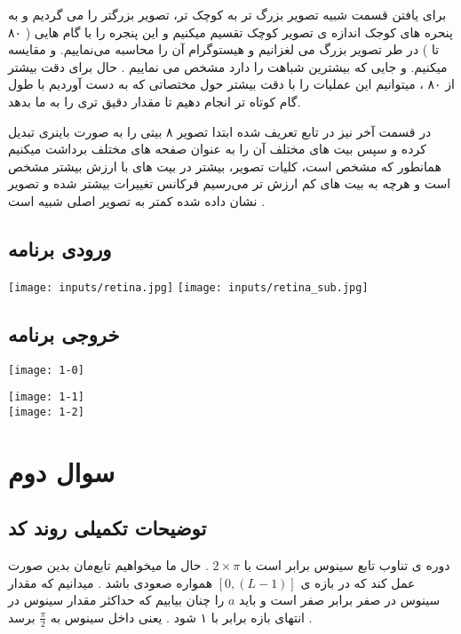 \documentclass[12pt]{article}
\begin{document}
			برای یافتن قسمت شبیه تصویر بزرگ تر به کوچک تر، تصویر بزرگتر را می گردیم و به پنحره های کوجک اندازه ی تصویر کوچک تقسیم میکنیم و این پنجره را با گام هایی ( ۸۰ تا ) در طر تصویر بزرگ می لغزانیم و هیستوگرام آن را محاسبه می‌نماییم. و مقایسه میکنیم. و جایی که بیشترین شباهت را دارد مشخص می نماییم . حال برای دقت بیشتر از ۸۰ ، میتوانیم این عملیات را با دقت بیشتر حول مختصاتی که به دست آوردیم با طول گام کوتاه تر انجام دهیم تا مقدار دقیق تری را به ما بدهد.
		
			در قسمت آخر نیز در تابع تعریف شده ابتدا تصویر ۸ بیتی را به صورت باینری تبدیل کرده و سپس بیت های مختلف آن را به عنوان صفحه های مختلف برداشت میکنیم  
			همانطور که مشخص است، کلیات تصویر، بیشتر در بیت های با ارزش بیشتر مشخص است و هرچه به بیت های کم ارزش تر می‌رسیم فرکانس تغییرات بیشتر شده و تصویر نشان داده شده کمتر به تصویر اصلی شبیه است .
		\subsection{ورودی برنامه}
		\texttt{[image: inputs/retina.jpg]}
		\texttt{[image: inputs/retina\_sub.jpg]}
		\subsection{خروجی برنامه}
		
		\texttt{[image: 1-0]}
		
		\texttt{[image: 1-1]}\\
		\texttt{[image: 1-2]}
		
		
		\newpage
		
		\section{سوال دوم }
		\subsection{توضیحات تکمیلی روند کد}
	دوره ی تناوب تابع سینوس برابر است با 
	$2 \times \pi $
	.
	حال ما میخواهیم تابع‌مان بدین صورت عمل کند که در بازه ی 
	$ [ 0 , (L-1) ] $
	همواره صعودی باشد . میدانیم که مقدار سینوس در صفر برابر صفر است و باید 
	$a$
	را چنان بیابیم که حداکثر مقدار سینوس در انتهای بازه برابر با ۱ شود . یعنی داخل سینوس به 
	$\frac{ \pi}{2} $
	برسد .
\end{document}
